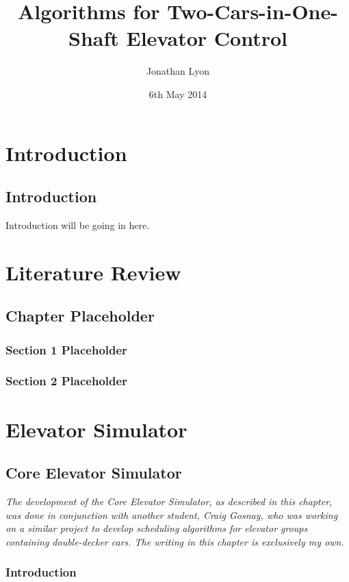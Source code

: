 \documentclass{UoYCSproject}
\author{Jonathan Lyon}
\title{Algorithms for Two-Cars-in-One-Shaft Elevator Control}
\date{6th May 2014}
\begin{document}
\maketitle 

\part{Introduction}

\chapter{Introduction}

Introduction will be going in here.

\part{Literature Review}

\chapter{Chapter Placeholder}

\section{Section 1 Placeholder}
\section{Section 2 Placeholder}

\part{Elevator Simulator}

\chapter{Core Elevator Simulator}

\textit{The development of the Core Elevator Simulator, as described in this chapter, was done in conjunction with another student, Craig Gosnay, who was working on a similar project to develop scheduling algorithms for elevator groups containing double-decker cars.  The writing in this chapter is exclusively my own.}

\section{Introduction}
\end{document}
